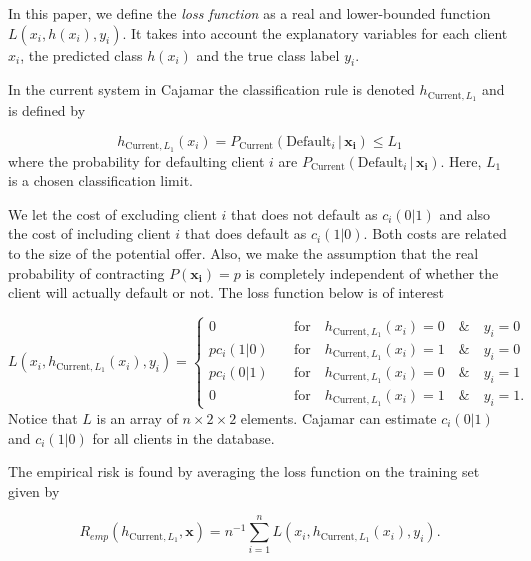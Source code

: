 \documentclass{article}
\theoremstyle{theorem}
\theoremstyle{definition}
\newcommand{\bv}[1]{\bm{#1}}
\begin{document}
{In this paper, we define the \emph{loss function} as a real and lower-bounded function $L(x_i, h(x_i), y_i)$. It takes into account the explanatory variables for each client $x_i$, the predicted class $h(x_i)$ and the true class label $y_i$. 

In the current system in Cajamar the classification rule is denoted $h_{\mbox{Current},L_1}$ and is defined by

\begin{equation}
\label{def:empRisk}
h_{\mbox{Current},L_1}(x_i) = P_{\mbox{Current}}(\mbox{Default}_i \,|\, \bv{x_i}) \leq L_1 
\end{equation}
where the probability for defaulting client $i$ are $P_{\mbox{Current}}(\mbox{Default}_i \,|\, \bv{x_i})$.  Here, $L_1$ is a chosen classification limit. 

We let the cost of excluding client $i$ that does not default as $c_i(0|1)$ and also the cost of including client $i$ that does default as $c_i(1|0)$.  Both costs are related to the size of the potential offer.  Also, we make the assumption that the real probability of contracting $P(\bv{x_i}) = p$ is completely independent of whether the client will actually default or not.  The loss function below is of interest

\begin{equation}
\label{def:empRiskBank}
L(x_i, h_{\mbox{Current},L_1}(x_i) , y_i) = 
\begin{cases}
0     &\quad \mbox{for} \quad h_{\mbox{Current},L_1}(x_i) = 0 \quad \& \quad y_i = 0\\
p c_i(1|0)    &\quad \mbox{for} \quad h_{\mbox{Current},L_1}(x_i) = 1 \quad \& \quad y_i = 0\\
p c_i(0|1)      &\quad \mbox{for} \quad h_{\mbox{Current},L_1}(x_i) = 0 \quad \& \quad y_i = 1\\
0   &\quad \mbox{for} \quad h_{\mbox{Current},L_1}(x_i) = 1 \quad \& \quad y_i = 1.
\end{cases}
\end{equation}
Notice that $L$ is an array of $n \times 2\times 2$ elements. Cajamar can estimate $c_i(0|1)$ and $c_i(1|0)$ for all clients in the database.

The empirical risk is found by averaging the loss function on the training set given by 

\begin{equation}
\label{def:empRisk}
R_{emp}(h_{\mbox{Current},L_1}, \bv{x}) = n^{-1} \sum_{i=1}^n L(x_i, h_{\mbox{Current},L_1}(x_i), y_i).
\end{equation}

}
\end{document}
